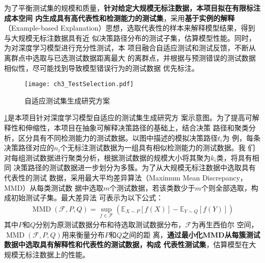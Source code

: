 为了平衡测试集的规模和质量，\textbf{针对给定大规模无标注数据，本项目拟在有限标注成本空间
内生成具有高代表性和检测能力的测试集}，采用\textbf{基于实例的解释}（Example-based
    Explanation）思想，选取代表性的样本来解释模型结果，得到与大规模无标注数据具有近
似决策路径分布的测试子集，估算模型性能。同时，为对深度学习模型进行充分性测试，本
项目{融合自适应测试和测试反馈}，不断从离群点中选取与已选测试数据距离最大
的离群点，并根据与预测错误的测试数据相似性，尽可能找到导致模型错误行为的测试数据
优先标注。



\begin{figure}[htp]
    \begin{small}
        \begin{center}
            \texttt{[image: ch3\_TestSelection.pdf]}
        \end{center}
        \caption{自适应测试集生成研究方案}
        \label{fig:ch3:interpretability}
    \end{small}
\end{figure}

\cref{fig:ch3:interpretability}是本项目针对深度学习模型自适应的测试集生成研究方
案示意图。为了提高可解释性和伸缩性，本项目在抽象可解释决策路径的基础上，结合决策
路径和聚类分析，区分具有不同检测能力的测试数据。以图中描述的模拟决策路径$t_i$为
例，每条决策路径对应的$n_i$个无标注测试数据为一组具有相似检测能力的测试数据。我
们对每组测试数据进行聚类分析，根据测试数据的规模大小将其聚为$k_i$类，将具有相同
决策路径的测试数据进一步划分为多簇。为了从大规模无标注数据中选取具有代表性的测试
数据，采用{最大平均差异算法}（Maximum Mean Discrepancy，MMD）从每类测试数
据中选取$m$个测试数据，若该类数少于$m$个则全部选取，构成初始测试子集。最大差异法
可表示为以下公式：
\begin{equation}
    \begin{aligned}
        \operatorname{MMD}(\mathcal{F}, P, Q)=\sup _{f \in \mathcal{F}}\left(\mathbb{E}_{X \sim P}[f(X)]-\mathbb{E}_{Y \sim Q}[f(Y)]\right)
    \end{aligned}
\end{equation}
其中$P$和$Q$分别为原测试数据分布和待选取测试数据分布，$\mathcal{F}$为再生西伯尔
空间，$\operatorname{MMD}(\mathcal{F}, P, Q)$用来衡量分布$P$和$Q$之间的距
离，\textbf{通过最小化MMD从每簇测试数据中选取具有解释性和代表性的测试数据，构成
    代表性测试集}，估算模型在大规模无标注数据上的性能。

